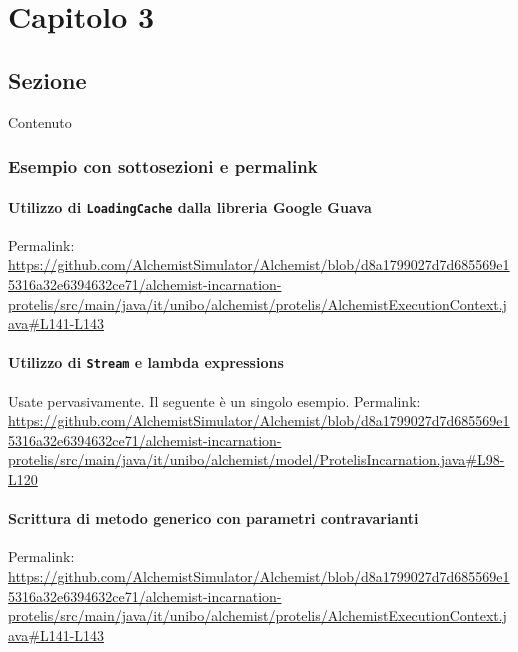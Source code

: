 \documentclass[a4paper,12pt]{report}
\begin{document}
\chapter{Capitolo 3}
\section{Sezione}

Contenuto

\subsection{Esempio con sottosezioni e permalink}

\subsubsection{Utilizzo di \texttt{LoadingCache} dalla libreria Google Guava}

Permalink: \url{https://github.com/AlchemistSimulator/Alchemist/blob/d8a1799027d7d685569e15316a32e6394632ce71/alchemist-incarnation-protelis/src/main/java/it/unibo/alchemist/protelis/AlchemistExecutionContext.java#L141-L143}

\subsubsection{Utilizzo di \texttt{Stream} e lambda expressions}

Usate pervasivamente. Il seguente è un singolo esempio.
Permalink: \url{https://github.com/AlchemistSimulator/Alchemist/blob/d8a1799027d7d685569e15316a32e6394632ce71/alchemist-incarnation-protelis/src/main/java/it/unibo/alchemist/model/ProtelisIncarnation.java#L98-L120}

\subsubsection{Scrittura di metodo generico con parametri contravarianti}

Permalink: \url{https://github.com/AlchemistSimulator/Alchemist/blob/d8a1799027d7d685569e15316a32e6394632ce71/alchemist-incarnation-protelis/src/main/java/it/unibo/alchemist/protelis/AlchemistExecutionContext.java#L141-L143}

\nocite{*}


\end{document}

